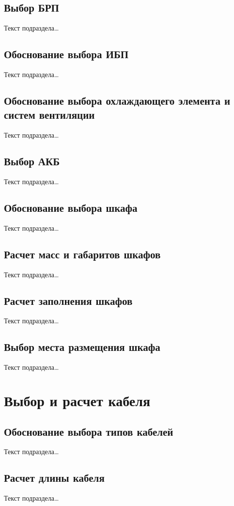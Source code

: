 \documentclass[a4paper,oneside,14pt]{extreport}
\begin{document}
\section{Выбор БРП}
Текст подраздела\ldots

\section{Обоснование выбора ИБП}
Текст подраздела\ldots

\section{Обоснование выбора охлаждающего элемента и систем вентиляции}
Текст подраздела\ldots

\section{Выбор АКБ}
Текст подраздела\ldots

\section{Обоснование выбора шкафа}
Текст подраздела\ldots

\section{Расчет масс и габаритов шкафов}
Текст подраздела\ldots

\section{Расчет заполнения шкафов}
Текст подраздела\ldots

\section{Выбор места размещения шкафа}
Текст подраздела\ldots


\chapter{Выбор и расчет кабеля}

\section{Обоснование выбора типов кабелей}
Текст подраздела\ldots

\section{Расчет длины кабеля}
Текст подраздела\ldots
\end{document}
